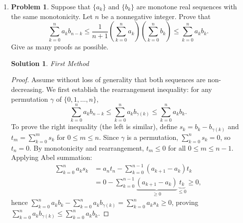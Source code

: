 \documentclass[12pt]{article}
\theoremstyle{definition}
\newtheorem*{solution}{\normalfont\textbf{Solution}}
\newtheorem*{Problem}{\noindent\textbf{Problem}}
\begin{document}
\begin{enumerate}[leftmargin=*]
    \item \begin{Problem}
            Suppose that \( \{ a_k \} \) and \( \{ b_k \} \) are monotone real sequences with the same monotonicity. Let \( n \) be a nonnegative integer. Prove that
            \[
            \sum_{k=0}^n a_k b_{n - k} \leq \frac{1}{n + 1} \left( \sum_{k=0}^n a_k \right) \left( \sum_{k=0}^n b_k \right) \leq \sum_{k=0}^n a_k b_k.
            \]
            Give as many proofs as possible.
        \end{Problem}
        \begin{solution}
        \textit{First Method }
            \begin{proof}
                Assume without loss of generality that both sequences are non-decreasing. We first establish the rearrangement inequality: for any permutation $\gamma$ of $\{0,1,\dots,n\}$,
                \[
                \sum_{k=0}^n a_k b_{n-k} \leq \sum_{k=0}^n a_k b_{\gamma(k)} \leq \sum_{k=0}^n a_k b_k.
                \]
                To prove the right inequality (the left is similar), define $s_k = b_k - b_{\gamma(k)}$ and $t_m = \sum_{k=0}^m s_k$ for $0 \leq m \leq n$. Since $\gamma$ is a permutation, $\sum_{k=0}^n s_k = 0$, so $t_n = 0$. By monotonicity and rearrangement, $t_m \leq 0$ for all $0 \leq m \leq n-1$. Applying Abel summation:
                \begin{align*}
                \sum_{k=0}^n a_k s_k 
                &= a_n t_n - \sum_{k=0}^{n-1} (a_{k+1} - a_k) t_k \\
                &= 0 - \sum_{k=0}^{n-1} \underbrace{(a_{k+1} - a_k)}_{\geq 0} \underbrace{t_k}_{\leq 0} \geq 0,
                \end{align*}
                hence $\sum_{k=0}^n a_k b_k - \sum_{k=0}^n a_k b_{\gamma(k)} = \sum_{k=0}^n a_k s_k \geq 0$, proving $\sum_{k=0}^n a_k b_{\gamma(k)} \leq \sum_{k=0}^n a_k b_k$.


\end{proof}
\end{solution}
\end{enumerate}
\end{document}
